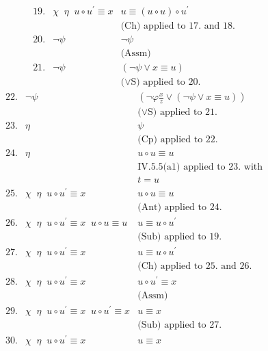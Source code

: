 \begin{enumerate}[1.]
\[\begin{array}{lll}
19. & \chi \;\; \eta \;\; u \circ u^\prime \equiv x & u \equiv (u \circ u) \circ u^\prime \\
\   & \                                       & \mbox{(Ch) applied to 17. and 18.} \\
20. & \neg \psi & \neg \psi \\
\   & \               & \mbox{(Assm)} \\
21. & \neg \psi & (\neg \psi \lor x \equiv u) \\
\   & \               & \mbox{($\lor$S) applied to 20.}
\end{array}
\]
\[
\begin{array}{lll}
22. & \neg \psi & (\neg \varphi\frac{x}{z} \lor (\neg \psi \lor x \equiv u)) \\
\   & \               & \mbox{($\lor$S) applied to 21.} \\
23. & \eta & \psi \\
\   & \ & \mbox{(Cp) applied to 22.} \\
24. & \eta & u \circ u \equiv u \\
\   & \ & \mbox{IV.5.5(a1) applied to 23. with} \\
\   & \ & \mbox{$t = u$} \\
25. & \chi \;\; \eta \;\; u \circ u^\prime \equiv x & u \circ u \equiv u \\
\   &                                         & \mbox{(Ant) applied to 24.} \\
26. & \chi \;\; \eta \;\; u \circ u^\prime \equiv x \;\; u \circ u \equiv u & u \equiv u \circ u^\prime \\
\   & \                                       & \mbox{(Sub) applied to 19.} \\
27. & \chi \;\; \eta \;\; u \circ u^\prime \equiv x & u \equiv u \circ u^\prime \\
\   & \                                       & \mbox{(Ch) applied to 25. and 26.} \\
28. & \chi \;\; \eta \;\; u \circ u^\prime \equiv x & u \circ u^\prime \equiv x \\
\   & \                                       & \mbox{(Assm)} \\
29. & \chi \;\; \eta \;\; u \circ u^\prime \equiv x \;\; u \circ u^\prime \equiv x & u \equiv x \\
\   & \                                       & \mbox{(Sub) applied to 27.} \\
30. & \chi \;\; \eta \;\; u \circ u^\prime \equiv x & u \equiv x \\

\end{array}\]
\end{enumerate}
